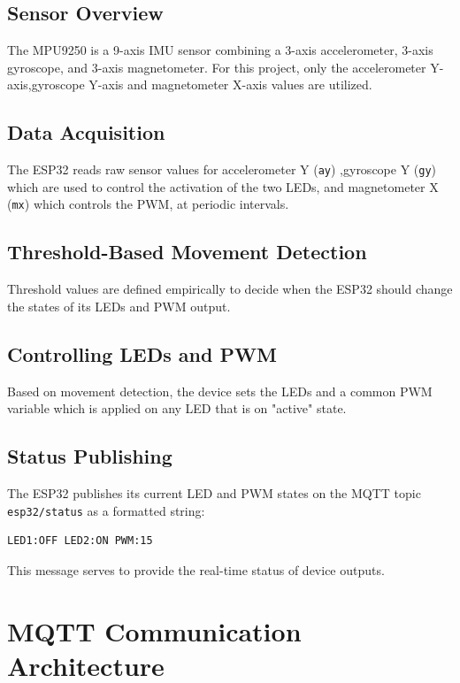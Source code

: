 \documentclass[a4paper,12pt]{article}
\begin{document}
\subsection{Sensor Overview}

The MPU9250 is a 9-axis IMU sensor combining a 3-axis accelerometer, 
3-axis gyroscope, and 3-axis magnetometer. 
For this project, only the accelerometer Y-axis,gyroscope Y-axis and magnetometer X-axis values 
are utilized.
\subsection{Data Acquisition}

The ESP32 reads raw sensor values for accelerometer Y (\texttt{ay}) 
,gyroscope Y (\texttt{gy}) which are used to control the activation of the two LEDs, 
and magnetometer X (\texttt{mx}) which controls the PWM, at periodic intervals.

\subsection{Threshold-Based Movement Detection}

Threshold values are defined empirically to decide when the ESP32 should 
change the states of its LEDs and PWM output.


\subsection{Controlling LEDs and PWM}

Based on movement detection, the device sets the LEDs and a common PWM variable which is applied on 
any LED that is on "active" state.

\subsection{Status Publishing}

The ESP32 publishes its current LED and PWM states 
on the MQTT topic \texttt{esp32/status} as a formatted string:

{\scriptsize
\begin{verbatim}
LED1:OFF LED2:ON PWM:15
\end{verbatim}
}
This message serves to provide the
real-time status of device outputs.

\section{MQTT Communication Architecture}
\end{document}
